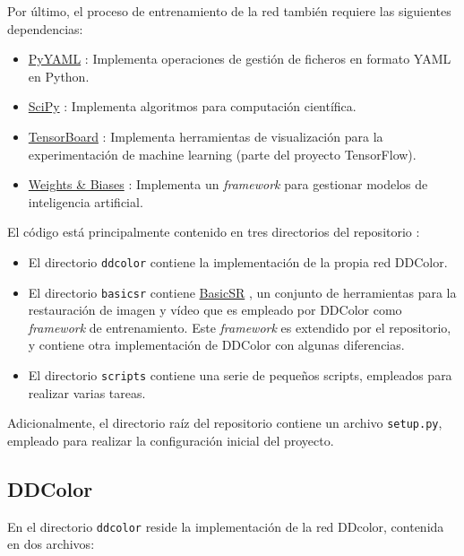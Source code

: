 \documentclass[a4paper]{article}
\begin{document}
Por último, el proceso de entrenamiento de la red también requiere las siguientes dependencias:

\begin{itemize}
  \item{\href{https://pyyaml.org/}{PyYAML} \cite{PyYAML}: Implementa operaciones de gestión de ficheros en formato YAML en Python.}
  \item{\href{https://scipy.org/}{SciPy} \cite{SciPy}: Implementa algoritmos para computación científica.}
  \item{\href{https://www.tensorflow.org/tensorboard}{TensorBoard} \cite{TensorBoard}: Implementa herramientas de visualización para la experimentación de machine learning (parte del proyecto TensorFlow).}
  \item{\href{https://wandb.ai/site/}{Weights \& Biases} \cite{WandB}: Implementa un \textit{framework} para gestionar modelos de inteligencia artificial.}
\end{itemize}

El código está principalmente contenido en tres directorios del repositorio \cite{DDColorRepo}:

\begin{itemize}
  \item{El directorio \texttt{ddcolor} contiene la implementación de la propia red DDColor.}
  \item{El directorio \texttt{basicsr} contiene \href{https://github.com/xpixelgroup/basicsr}{BasicSR} \cite{BasicSR}, un conjunto de herramientas para la restauración de imagen y vídeo que es empleado por DDColor como \textit{framework} de entrenamiento. Este \textit{framework} es extendido por el repositorio, y contiene otra implementación de DDColor con algunas diferencias.}
  \item{El directorio \texttt{scripts} contiene una serie de pequeños scripts, empleados para realizar varias tareas.}
\end{itemize}

Adicionalmente, el directorio raíz del repositorio contiene un archivo \texttt{setup.py}, empleado para realizar la configuración inicial del proyecto.

\subsection{DDColor}

En el directorio \texttt{ddcolor} reside la implementación de la red DDcolor, contenida en dos archivos:
\end{document}
